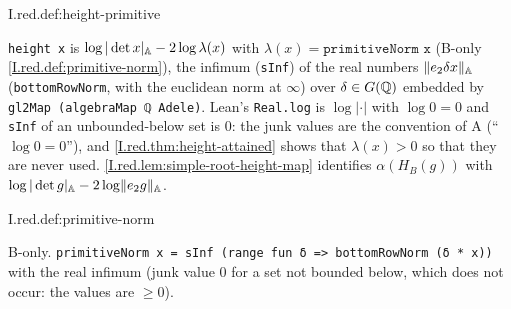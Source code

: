 \begin{definition}[height]
\end{definition}
\begin{tfformal}{I.red.def:height-primitive}
\begin{tffidelity}
\texttt{height x} is $\log|\det x|_{\mathbb{A}}-2\log\lambda(x)$ with $\lambda(x)=\texttt{primitiveNorm x}$ (B-only \cref{I.red.def:primitive-norm}), the infimum (\texttt{sInf}) of the real numbers $\lVert e_2\delta x\rVert_{\mathbb{A}}$ (\texttt{bottomRowNorm}, with the euclidean norm at $\infty$) over $\delta\in G(\mathbb{Q})$ embedded by \texttt{gl2Map (algebraMap ℚ Adele)}. Lean's \texttt{Real.log} is $\log|\cdot|$ with $\log0=0$ and \texttt{sInf} of an unbounded-below set is $0$: the junk values are the convention of A (``$\log0=0$''), and \cref{I.red.thm:height-attained} shows that $\lambda(x)>0$ so that they are never used. \cref{I.red.lem:simple-root-height-map} identifies $\alpha(H_B(g))$ with $\log|\det g|_{\mathbb{A}}-2\log\lVert e_2g\rVert_{\mathbb{A}}$.
\end{tffidelity}
\end{tfformal}

\begin{definition}
\bonly
{}
\end{definition}
\begin{tfformal}{I.red.def:primitive-norm}
\begin{tffidelity}
B-only. \texttt{primitiveNorm x = sInf (range fun δ => bottomRowNorm (δ * x))} with the real infimum (junk value $0$ for a set not bounded below, which does not occur: the values are $\ge0$).
\end{tffidelity}
\end{tfformal}

